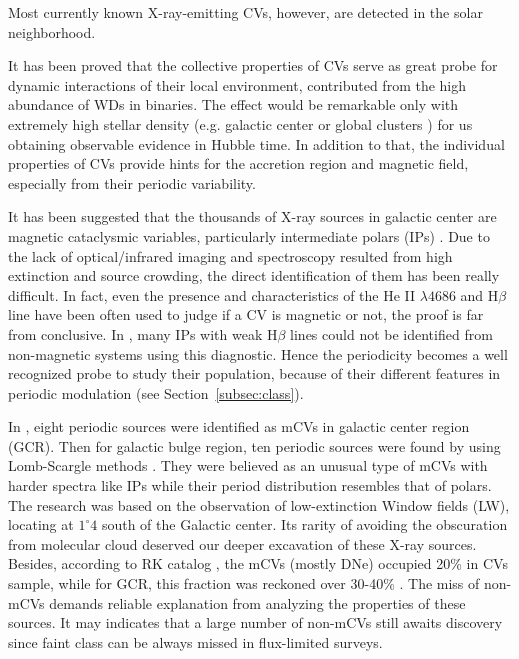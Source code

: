 \documentclass[fleqn,usenatbib]{mnras}
\begin{document}
Most currently known X-ray-emitting CVs, however, are detected in the solar neighborhood. 

It has been proved that the collective properties of CVs serve as great probe for dynamic interactions of their local environment, contributed from the high abundance of WDs in binaries. The effect would be remarkable only with extremely high stellar density (e.g. galactic center or global clusters \cite{2019ApJ...876...59C}) for us obtaining observable evidence in Hubble time. 
In addition to that, the individual properties of CVs provide hints for the accretion region and magnetic field, especially from their periodic variability.

It has been suggested that the thousands of X-ray sources in galactic center are magnetic cataclysmic variables, particularly intermediate
polars (IPs) \citep{2009ApJS..181..110M,2018ApJS..235...26Z}. Due to the lack of optical/infrared imaging and spectroscopy resulted from high extinction and source crowding, the direct identification of them has been really difficult.
In fact, even the presence and characteristics of the He II $\lambda 4686$ and H$\beta$ line have been often used to judge if a CV is magnetic or not, the proof is far from conclusive. In \cite{1992PhDT.......119S}, many IPs with weak H$\beta$ lines could not be identified from non-magnetic systems using this diagnostic. 
Hence the periodicity becomes a well recognized probe to study their population, because of their different features in periodic modulation (see Section~\ref{subsec:class}).  

In \citet{2003ApJ...599..465M}, eight periodic sources were identified as mCVs in galactic center region (GCR). Then for galactic bulge region, ten periodic sources were found by using Lomb-Scargle methods \citep{2012ApJ...746..165H}. They were believed as an unusual type of mCVs with harder spectra like IPs while their period distribution resembles that of polars. The research was based on the observation of low-extinction Window fields (LW), locating at $1^{\circ}4$ south of the Galactic center. Its rarity of avoiding the obscuration from molecular cloud deserved our deeper excavation of these X-ray sources. 
Besides, according to RK catalog \citep{2003A&A...404..301R}, the mCVs (mostly DNe) occupied 20\% in CVs sample, while for GCR, this fraction was reckoned over 30-40\% \citep{2016ApJ...826..160H,2012ApJ...746..165H}. The miss of non-mCVs demands reliable explanation from analyzing the properties of these sources. It may indicates that a large number of non-mCVs still awaits discovery since faint class can be always missed in flux-limited surveys.
\end{document}
